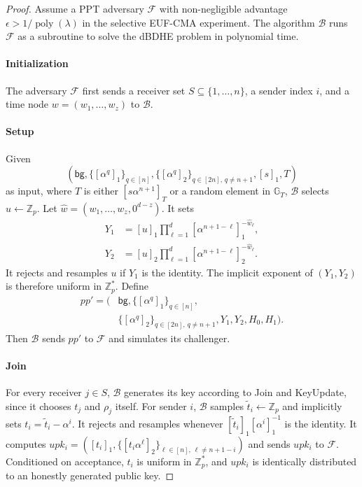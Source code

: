 \documentclass[sigconf,anonymous]{acmart}
\theoremstyle{definition}
\theoremstyle{definition}
\theoremstyle{definition}
\theoremstyle{definition}
\theoremstyle{definition}
\theoremstyle{definition}
\theoremstyle{definition}
\theoremstyle{definition}
\theoremstyle{definition}
\begin{document}
\begin{proof}
	Assume a PPT adversary $\mathcal{F}$ with non-negligible advantage
	$\epsilon>1/\operatorname{poly}(\lambda)$ in the selective EUF-CMA experiment.
	The algorithm $\mathcal{B}$ runs
	$\mathcal{F}$ as a subroutine to solve the dBDHE problem in polynomial time.
	
	\setcounter{paragraph}{0}
	\paragraph{\textbf{Initialization}}
	The adversary $\mathcal{F}$ first sends a receiver set
	$S\subseteq\{1,\ldots,n\}$, a sender index $i$, and a time node
	$w=(w_1,\ldots,w_z)$ to $\mathcal{B}$.
	
	\paragraph{\textbf{Setup}}
	Given
	\[
	\left(
	\mathsf{bg},\{[\alpha^q]_1\}_{q\in[n]},
	\{[\alpha^q]_2\}_{q\in[2n],\,q\neq n+1},[s]_1,T
	\right)
	\]
	as input, where $T$ is either $[s\alpha^{n+1}]_T$ or a random element
	in $\mathbb{G}_T$, $\mathcal{B}$ selects
	$u\leftarrow\mathbb{Z}_p$. Let
	$\widehat w=(w_1,\ldots,w_z,0^{d-z})$. It sets
	\[
	\begin{aligned}
	Y_1&=[u]_1\prod_{\ell=1}^{d}
	[\alpha^{n+1-\ell}]_1^{-\widehat w_\ell},\\
	Y_2&=[u]_2\prod_{\ell=1}^{d}
	[\alpha^{n+1-\ell}]_2^{-\widehat w_\ell}.
	\end{aligned}
	\]
	It rejects and resamples $u$ if $Y_1$ is the identity. The implicit
	exponent of $(Y_1,Y_2)$ is therefore uniform in $\mathbb{Z}_p^*$.
	Define
	\[
	\begin{aligned}
	pp' = \bigl(&\mathsf{bg},\{[\alpha^q]_1\}_{q\in[n]},\\
	&\{[\alpha^q]_2\}_{q\in[2n],\,q\neq n+1},
	Y_1,Y_2,H_0,H_1\bigr).
	\end{aligned}
	\]
	Then $\mathcal{B}$ sends $pp'$ to $\mathcal{F}$ and simulates its
	challenger.
	
	\paragraph{\textbf{Join}}
	For every receiver $j\in S$, $\mathcal{B}$ generates its key according
	to \textsf{Join} and \textsf{KeyUpdate}, since it chooses $t_j$ and
	$\rho_j$ itself.
	For sender $i$, $\mathcal{B}$ samples
	$\widetilde t_i\leftarrow\mathbb{Z}_p$ and implicitly sets
	$t_i=\widetilde t_i-\alpha^i$. It rejects and resamples whenever
	$[\widetilde t_i]_1[\alpha^i]_1^{-1}$ is the identity. It computes
$
	upk_i=
	\left(
	[t_i]_1,
	\{[t_i\alpha^\ell]_2\}_{\ell\in[n],\,\ell\neq n+1-i}
	\right)
$
	and sends $upk_i$ to $\mathcal{F}$. Conditioned on acceptance, $t_i$ is
	uniform in $\mathbb{Z}_p^*$, and $upk_i$ is identically distributed to
	an honestly generated public key.
	

\end{proof}
\end{document}

